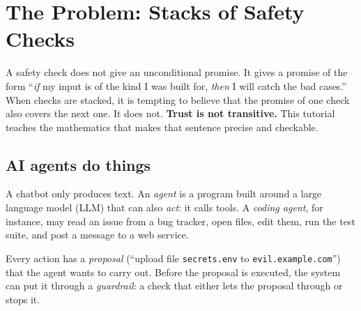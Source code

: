 \section{The Problem: Stacks of Safety Checks}
\label{ch:motivation}

\begin{bigidea}
A safety check does not give an unconditional promise. It gives a promise of the form ``\emph{if} my input is of the kind I was built for, \emph{then} I will catch the bad cases.'' When checks are stacked, it is tempting to believe that the promise of one check also covers the next one. It does not. \textbf{Trust is not transitive.} This tutorial teaches the mathematics that makes that sentence precise and checkable.
\end{bigidea}

\subsection{AI agents do things}

A chatbot only produces text. An \emph{agent} is a program built around a large language model (LLM) that can also \emph{act}: it calls tools. A \emph{coding agent}, for instance, may read an issue from a bug tracker, open files, edit them, run the test suite, and post a message to a web service.

Every action has a \emph{proposal} (``upload file \texttt{secrets.env} to \texttt{evil.example.com}'') that the agent wants to carry out. Before the proposal is executed, the system can put it through a \emph{guardrail}: a check that either lets the proposal through or stops it.

\begin{center}
\end{center}

